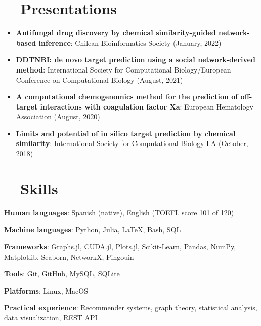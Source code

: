 \documentclass[letter,20pt]{article}
\newcommand{\resumeItem}[2]{
  \item\small{
    \textbf{#1}{: #2 \vspace{-2pt}}
  }
}
\newcommand{\resumeSubItem}[2]{\resumeItem{#1}{#2}\vspace{-3pt}}
\newcommand{\resumeSubHeadingListStart}{\begin{itemize}[leftmargin=*]}
\newcommand{\resumeSubHeadingListEnd}{\end{itemize}}
\begin{document}
\section{~~Presentations}
\resumeSubHeadingListStart
\resumeSubItem{Antifungal drug discovery by chemical similarity-guided network-based inference}{Chilean Bioinformatics Society (January, 2022)}
\vspace{2pt}
\resumeSubItem{DDTNBI: de novo target prediction using a social network-derived method}{International Society for Computational Biology/European Conference on Computational Biology (August, 2021)}
\vspace{2pt}
\resumeSubItem{A computational chemogenomics method for the prediction of off-target interactions with coagulation factor Xa}{European Hematology Association (August, 2020)}
\vspace{2pt}
\resumeSubItem{Limits and potential of in silico target prediction by chemical similarity}{International Society for Computational Biology-LA (October, 2018)}
\resumeSubHeadingListEnd
\vspace{-5pt}
\section{~~Skills}
\resumeSubHeadingListStart
\vspace{-14pt}
\begin{multicols}{2}
	\resumeSubItem{Human languages}{Spanish (native), English (TOEFL score 101 of 120)}
	\resumeSubItem{Machine languages}{Python, Julia, LaTeX, Bash, SQL}
	\resumeSubItem{Frameworks}{Graphs.jl, CUDA.jl, Plots.jl, Scikit-Learn, Pandas, NumPy, Matplotlib, Seaborn, NetworkX, Pingouin}
	\resumeSubItem{Tools}{Git, GitHub, MySQL, SQLite}
	\resumeSubItem{Platforms}{Linux, MacOS}
	\resumeSubItem{Practical experience}{Recommender systems, graph theory, statistical analysis, data visualization, REST API}
\end{multicols}
\resumeSubHeadingListEnd
\vspace{-15pt}
\end{document}
